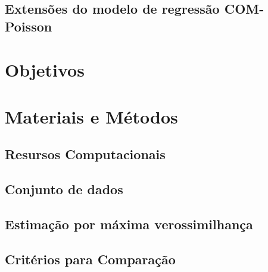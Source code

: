 \documentclass[10pt,ignorenonframetext,]{beamer}
\begin{document}
\subsection{Extensões do modelo de regressão
COM-Poisson}\label{extensoes-do-modelo-de-regressao-com-poisson}

\begin{frame}{}

\end{frame}

\section{Objetivos}\label{objetivos}

\begin{frame}{}

\end{frame}

\section{Materiais e Métodos}\label{materiais-e-metodos}

\subsection{Resursos Computacionais}\label{resursos-computacionais}

\begin{frame}{}

\end{frame}

\subsection{Conjunto de dados}\label{conjunto-de-dados}

\begin{frame}{}

\end{frame}

\subsection{Estimação por máxima
verossimilhança}\label{estimacao-por-maxima-verossimilhanca}

\begin{frame}{}

\end{frame}

\subsection{Critérios para Comparação}\label{criterios-para-comparacao}
\end{document}
